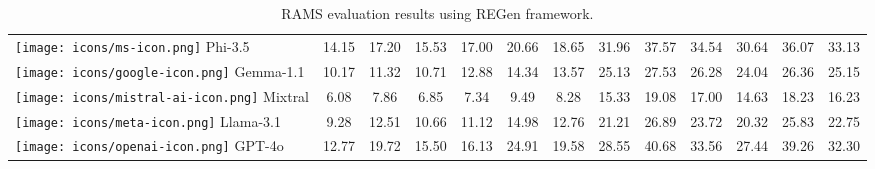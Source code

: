 \begin{table*}[h!]
\begin{tabular}{l|ccc|ccc|ccc|ccc}
\texttt{[image: icons/ms-icon.png]} Phi-3.5 & 14.15 & 17.20 & 15.53 & 17.00 & 20.66 & 18.65 & 31.96 & 37.57 & 34.54 & 30.64 & 36.07 & 33.13\\
\texttt{[image: icons/google-icon.png]} Gemma-1.1 & 10.17 & 11.32 & 10.71 & 12.88 & 14.34 & 13.57 & 25.13 & 27.53 & 26.28 & 24.04 & 26.36 & 25.15 \\
\texttt{[image: icons/mistral-ai-icon.png]} Mixtral & 6.08 & 7.86 & 6.85 & 7.34 & 9.49 & 8.28 & 15.33 & 19.08 & 17.00 & 14.63 & 18.23 & 16.23 \\
\texttt{[image: icons/meta-icon.png]} Llama-3.1 & 9.28 & 12.51 & 10.66 & 11.12 & 14.98 & 12.76 & 21.21 & 26.89 & 23.72 & 20.32 & 25.83 & 22.75 \\
\texttt{[image: icons/openai-icon.png]} GPT-4o & 12.77 & 19.72 & 15.50 & 16.13 & 24.91 & 19.58 & 28.55 & 40.68 & 33.56 & 27.44 & 39.26 & 32.30 \\

\bottomrule 
\end{tabular}
\caption{RAMS evaluation results using REGen framework.}
\label{RAMS-all-results}
\end{table*}

